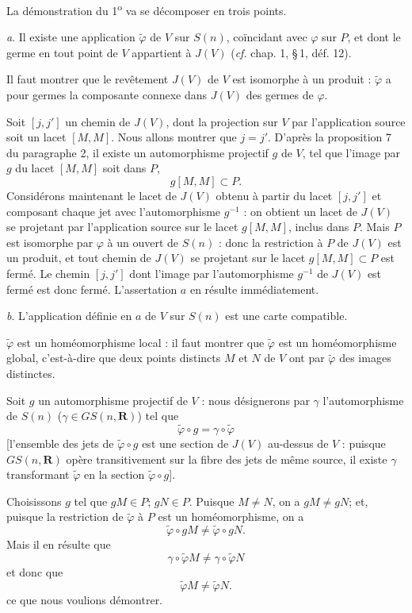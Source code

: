 \documentclass[11pt]{article}
\newcommand{\R}{\boldsymbol{R}}
\newcommand{\bzcf}[2]{#1}
\newenvironment{proof}[1][]{\par}{\par}
\begin{document}
\begin{proof}
La démonstration du 1\textsuperscript{o} va se décomposer en trois points.

\textit{a}. Il existe une application $\tilde{\varphi}$ de $V$ sur $S(n)$, coïncidant avec
$\varphi$ sur $P$, et dont le germe en tout point de $V$ appartient à $J(V)$ (\bzcf{\textit{cf.}
chap. 1, \S\,1, déf. 12}{\ref{bzdef:c1s1d12_variete_localement_projective}}).

Il faut montrer que le revêtement $J(V)$ de $V$ est isomorphe à un produit : $\tilde{\varphi}$ a
pour germes la composante connexe dans $J(V)$ des germes de $\varphi$.

Soit $[j, j']$ un chemin de $J(V)$, dont la projection sur $V$ par l'application source soit un
lacet $[M, M]$. Nous allons montrer que $j=j'$. D'après \bzcf{la proposition 7 du paragraphe
2}{\ref{bzprop:c2s2p7_compact_dans_poche}}, il existe un automorphisme projectif $g$ de $V$, tel
que l'image par $g$ du lacet $[M, M]$ soit dans $P$,
\[ g[M, M]\subset P. \]
Considérons maintenant le lacet de $J(V)$ obtenu à partir du lacet $[j, j']$ et composant chaque
jet avec l'automorphisme $g^{-1}$ : on obtient un lacet de $J(V)$ se projetant par l'application
source sur le lacet $g[M, M]$, inclus dans $P$. Mais $P$ est isomorphe par $\varphi$ à un ouvert
de $S(n)$ : donc la restriction à $P$ de $J(V)$ est un produit, et tout chemin de $J(V)$ se
projetant sur le lacet $g[M, M]\subset P$ est fermé. Le chemin $[j, j']$ dont l'image par
l'automorphisme $g^{-1}$ de $J(V)$ est fermé est donc fermé. L'assertation $a$ en résulte
immédiatement.

\textit{b}. L'application définie en $a$ de $V$ sur $S(n)$ est une carte compatible.

$\tilde{\varphi}$ est un homéomorphisme local : il faut montrer que $\tilde{\varphi}$ est un
homéomorphisme global, c'est-à-dire que deux points distincts $M$ et $N$ de $V$ ont par
$\tilde{\varphi}$ des images distinctes.

Soit $g$ un automorphisme projectif de $V$ : nous désignerons par $\gamma$ l'automorphisme de
$S(n)$ ($\gamma\in GS(n, \R)$) tel que
\[ \tilde{\varphi}\circ g=\gamma\circ\tilde{\varphi} \]
[l'ensemble des jets de $\tilde{\varphi}\circ g$ est une section de $J(V)$ au-dessus de $V$ :
puisque $GS(n, \R)$ opère transitivement sur la fibre des jets de même source, il existe $\gamma$
transformant $\tilde{\varphi}$ en la section $\tilde{\varphi}\circ g$].

Choisissons $g$ tel que $gM\in P$; $gN\in P$. Puisque $M\neq N$, on a $gM\neq gN$; et, puisque la
restriction de $\tilde{\varphi}$ à $P$ est un homéomorphisme, on a
\[ \tilde{\varphi}\circ gM\neq\tilde{\varphi}\circ gN. \]
Mais il en résulte que
\[ \gamma\circ\tilde{\varphi}M\neq\gamma\circ\tilde{\varphi}N \]
et donc que
\[ \tilde{\varphi}M\neq\tilde{\varphi}N. \]
ce que nous voulions démontrer.


\end{proof}
\end{document}
